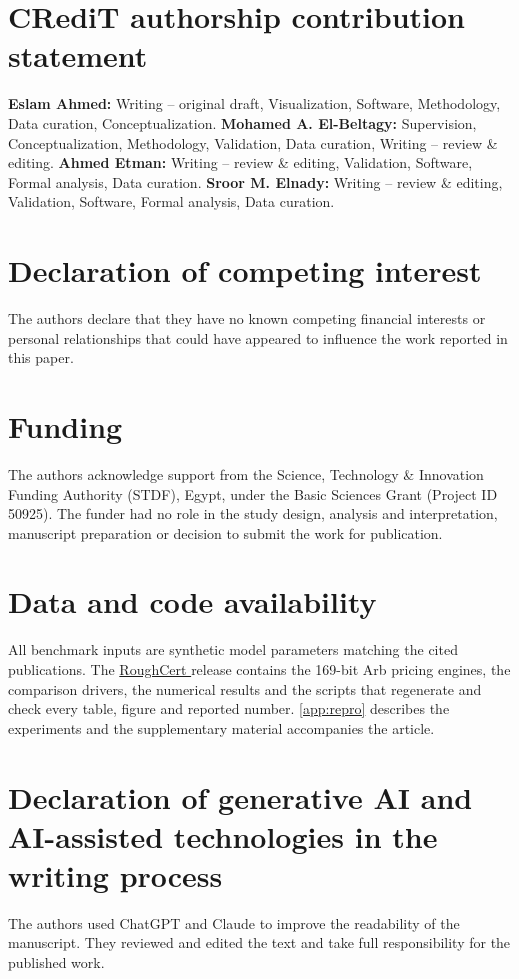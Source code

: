 \section*{CRediT authorship contribution statement}
\textbf{Eslam Ahmed:} Writing -- original draft, Visualization, Software, Methodology, Data curation, Conceptualization.
\textbf{Mohamed A. El-Beltagy:} Supervision, Conceptualization, Methodology, Validation, Data curation, Writing -- review \& editing.
\textbf{Ahmed Etman:} Writing -- review \& editing, Validation, Software, Formal analysis, Data curation.
\textbf{Sroor M. Elnady:} Writing -- review \& editing, Validation, Software, Formal analysis, Data curation.

\section*{Declaration of competing interest}
The authors declare that they have no known competing financial interests or personal relationships that could have appeared to influence the work reported in this paper.

\section*{Funding}
The authors acknowledge support from the Science, Technology \& Innovation Funding Authority (STDF), Egypt, under the Basic Sciences Grant (Project ID 50925). The funder had no role in the study design, analysis and interpretation, manuscript preparation or decision to submit the work for publication.

\section*{Data and code availability}
All benchmark inputs are synthetic model parameters matching the cited publications. The
\href{\ReleaseURL}{RoughCert \ReleaseTag} release contains the 169-bit Arb pricing engines, the comparison
drivers, the numerical results and the scripts that regenerate and check every table, figure and reported
number. \ref{app:repro} describes the experiments and the supplementary material accompanies the article.

\section*{Declaration of generative AI and AI-assisted technologies in the writing process}
The authors used ChatGPT and Claude to improve the readability of the manuscript. They reviewed and edited the text and take full responsibility for the published work.
